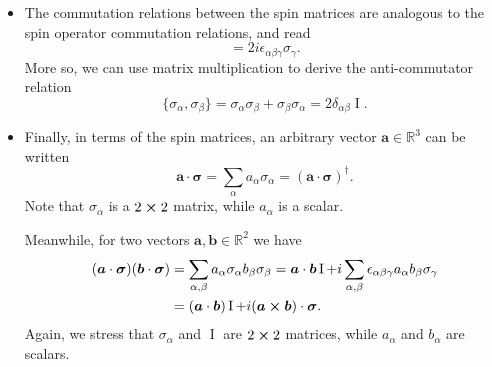 \documentclass[11pt, a4paper]{article}
\renewcommand{\vec}[1]{\bm{#1}}  %
\newcommand{\II}{\operatorname{I}}  %
\begin{document}
\begin{itemize}
	\item The commutation relations between the spin matrices are analogous to the spin operator commutation relations, and read
	\begin{equation*}
		[\sigma_{\alpha}, \sigma_{\beta}] = 2i \epsilon_{\alpha \beta \gamma} \sigma_{\gamma}.
	\end{equation*}
	More so, we can use matrix multiplication to derive the anti-commutator relation
	\begin{equation*}
		\{\sigma_{\alpha}, \sigma_{\beta}\} = \sigma_{\alpha}\sigma_{\beta} + \sigma_{\beta}\sigma_{\alpha} = 2 \delta_{\alpha \beta} \II.
	\end{equation*}
	
	\item Finally, in terms of the spin matrices, an arbitrary vector $ \vec{a} \in \mathbb{R}^{3} $ can be written 
	\begin{equation*}
		 \vec{a} \cdot \vec{\sigma} = \sum_{\alpha}a_{\alpha}\sigma_{\alpha} = (\vec{a} \cdot \vec{\sigma})^{\dagger}.
	\end{equation*}
	Note that $ \sigma_{\alpha} $ is a $ 2 \cross 2 $ matrix, while $ a_{\alpha} $ is a scalar. 

    Meanwhile, for two vectors $ \vec{a}, \vec{b} \in \mathbb{R}^{2} $ we have
	\begin{align*}
		(\vec{a} \cdot \vec{\sigma})(\vec{b} \cdot \vec{\sigma}) &= \sum_{\alpha, \beta} a_{\alpha}\sigma_{\alpha}b_{\beta}\sigma_{\beta} = \vec{a}\cdot \vec{b}\II + i \sum_{\alpha, \beta} \epsilon_{\alpha \beta \gamma}a_{\alpha}b_{\beta} \sigma_{\gamma}\\
		& = (\vec{a}\cdot \vec{b})\II + i(\vec{a}\cross \vec{b})\cdot \vec{\sigma}.
	\end{align*}
	Again, we stress that $ \sigma_{\alpha} $  and $ \II$ are $ 2 \cross 2 $ matrices, while $ a_{\alpha} $ and $ b_{\alpha} $ are scalars.
	

\end{itemize}
\end{document}
